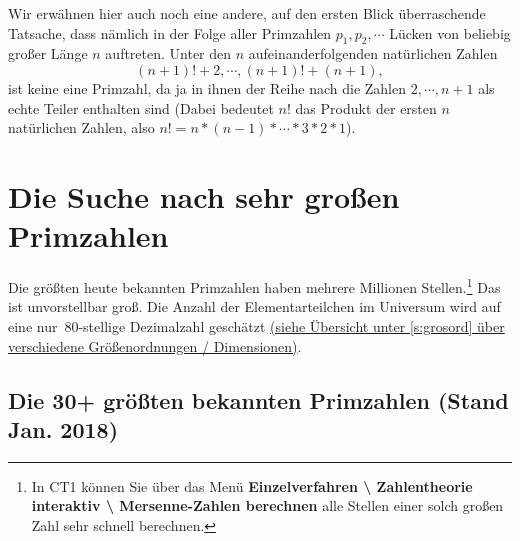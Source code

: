 \begin{refsegment}
Wir erwähnen hier auch noch eine andere, auf den ersten Blick
überraschende Tatsache, dass nämlich in der Folge aller
Primzahlen $p_1, p_2, \cdots $ Lücken von beliebig großer
Länge $n$ auftreten. Unter den $n$ aufeinanderfolgenden
natürlichen Zahlen
$$
    (n+1)!+2, \cdots, (n+1)!+(n+1),
$$
ist keine eine Primzahl, da ja in ihnen der Reihe nach die
Zahlen $2,\cdots, n+1$ als echte Teiler enthalten sind
(Dabei bedeutet $n!$ das Produkt der ersten $n$ natürlichen
Zahlen, also $n!=n*(n-1)* \cdots *3*2*1$).


\newpage
\section{Die Suche nach sehr großen Primzahlen}
\label{search_for_very_big_primes}   %

Die größten heute bekannten Primzahlen haben mehrere
Millionen Stellen.\footnote{%
	In CT1 können Sie über das Menü
	{\bf Einzelverfahren \textbackslash{} Zahlentheorie
	interaktiv \textbackslash{} Mersenne-Zahlen berechnen}
	alle Stellen einer solch großen Zahl sehr schnell berechnen.
}
Das ist unvorstellbar groß. Die Anzahl der Elementarteilchen im
Universum wird auf eine \glqq nur\grqq\ $80$-stellige Dezimalzahl
geschätzt \hyperlink{grosord}{(siehe Übersicht unter \ref{s:grosord}
über verschiedene Größenordnungen / Dimensionen)}.



\hypertarget{RecordPrimes}{}
\subsection{Die 30+ größten bekannten Primzahlen (Stand Jan. 2018)}  %
\label{RecordPrimes}


\end{refsegment}
